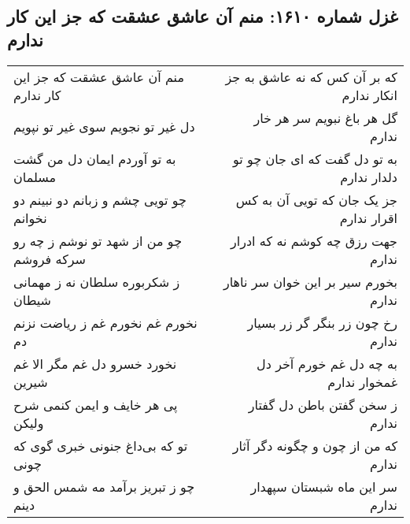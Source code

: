\begin{center}
\section*{غزل شماره ۱۶۱۰: منم آن عاشق عشقت که جز این کار ندارم}
\label{sec:1610}
\begin{longtable}{l p{0.5cm} r}
منم آن عاشق عشقت که جز این کار ندارم
&&
که بر آن کس که نه عاشق به جز انکار ندارم
\\
دل غیر تو نجویم سوی غیر تو نپویم
&&
گل هر باغ نبویم سر هر خار ندارم
\\
به تو آوردم ایمان دل من گشت مسلمان
&&
به تو دل گفت که ای جان چو تو دلدار ندارم
\\
چو تویی چشم و زبانم دو نبینم دو نخوانم
&&
جز یک جان که تویی آن به کس اقرار ندارم
\\
چو من از شهد تو نوشم ز چه رو سرکه فروشم
&&
جهت رزق چه کوشم نه که ادرار ندارم
\\
ز شکربوره سلطان نه ز مهمانی شیطان
&&
بخورم سیر بر این خوان سر ناهار ندارم
\\
نخورم غم نخورم غم ز ریاضت نزنم دم
&&
رخ چون زر بنگر گر زر بسیار ندارم
\\
نخورد خسرو دل غم مگر الا غم شیرین
&&
به چه دل غم خورم آخر دل غمخوار ندارم
\\
پی هر خایف و ایمن کنمی شرح ولیکن
&&
ز سخن گفتن باطن دل گفتار ندارم
\\
تو که بی‌داغ جنونی خبری گوی که چونی
&&
که من از چون و چگونه دگر آثار ندارم
\\
چو ز تبریز برآمد مه شمس الحق و دینم
&&
سر این ماه شبستان سپهدار ندارم
\\
\end{longtable}
\end{center}

